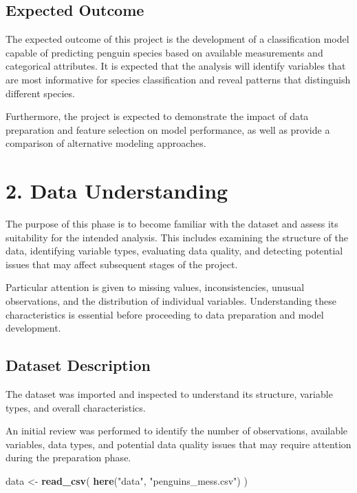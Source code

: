 \documentclass[
]{article}
\newenvironment{Shaded}{\begin{snugshade}}{\end{snugshade}}
\newcommand{\FunctionTok}[1]{\textcolor[rgb]{0.13,0.29,0.53}{\textbf{#1}}}
\newcommand{\NormalTok}[1]{#1}
\newcommand{\OtherTok}[1]{\textcolor[rgb]{0.56,0.35,0.01}{#1}}
\newcommand{\StringTok}[1]{\textcolor[rgb]{0.31,0.60,0.02}{#1}}
\begin{document}
\subsection{Expected Outcome}\label{expected-outcome}

The expected outcome of this project is the development of a
classification model capable of predicting penguin species based on
available measurements and categorical attributes. It is expected that
the analysis will identify variables that are most informative for
species classification and reveal patterns that distinguish different
species.

Furthermore, the project is expected to demonstrate the impact of data
preparation and feature selection on model performance, as well as
provide a comparison of alternative modeling approaches.

\section{2. Data Understanding}\label{data-understanding}

The purpose of this phase is to become familiar with the dataset and
assess its suitability for the intended analysis. This includes
examining the structure of the data, identifying variable types,
evaluating data quality, and detecting potential issues that may affect
subsequent stages of the project.

Particular attention is given to missing values, inconsistencies,
unusual observations, and the distribution of individual variables.
Understanding these characteristics is essential before proceeding to
data preparation and model development.

\subsection{Dataset Description}\label{dataset-description}

The dataset was imported and inspected to understand its structure,
variable types, and overall characteristics.

An initial review was performed to identify the number of observations,
available variables, data types, and potential data quality issues that
may require attention during the preparation phase.

\begin{Shaded}
\begin{Highlighting}[]
\NormalTok{data }\OtherTok{\textless{}{-}} \FunctionTok{read\_csv}\NormalTok{(}
  \FunctionTok{here}\NormalTok{(}\StringTok{"data"}\NormalTok{, }\StringTok{"penguins\_mess.csv"}\NormalTok{)}
\NormalTok{)}
\end{Highlighting}
\end{Shaded}
\end{document}

